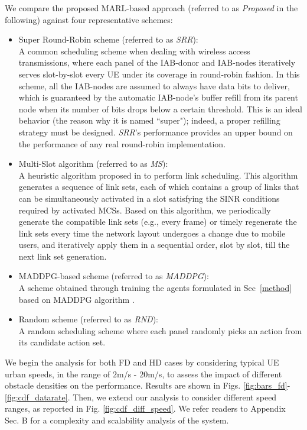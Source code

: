We compare the proposed MARL-based approach (referred to as \textit{Proposed} in the following) against four representative schemes:
\begin{itemize}
	\item Super Round-Robin scheme (referred to as \textit{SRR}):\\
    A common scheduling scheme when dealing with wireless access transmissions, where each panel of the IAB-donor and IAB-nodes iteratively serves slot-by-slot every UE under its coverage in round-robin fashion. In this scheme, all the IAB-nodes are assumed to always have data bits to deliver, which is guaranteed by the automatic IAB-node's buffer refill from its parent node when its number of bits drops below a certain threshold. This is an ideal behavior (the reason why it is named ``super"); indeed, a proper refilling strategy must be designed. \textit{SRR}'s performance provides an upper bound on the performance of any real round-robin implementation.
	\item Multi-Slot algorithm (referred to as \textit{MS}):\\
 A heuristic algorithm proposed in \cite{saad2019millimeter} to perform link scheduling. This algorithm generates a sequence of link sets, each of which contains a group of links that can be simultaneously activated in a slot satisfying the SINR conditions required by activated MCSs. Based on this algorithm, we periodically generate the compatible link sets (e.g., every frame) or timely regenerate the link sets every time the network layout undergoes a change due to mobile users, and iteratively apply them in a sequential order, slot by slot, till the next link set generation.
        
        \item MADDPG-based scheme (referred to as \textit{MADDPG}):\\ A scheme obtained through training the agents formulated in Sec~\ref{method} based on MADDPG algorithm \cite{maddpg}. 
        
        \item Random scheme (referred to as \textit{RND}):\\
        A random scheduling scheme where each panel randomly picks an action from its candidate action set.
\end{itemize}

We begin the analysis for both FD and HD cases by considering typical UE urban speeds, in the range of $2$m/s - $20$m/s, to assess the impact of different obstacle densities on the performance. Results are shown in Figs. \ref{fig:bars_fd}-\ref{fig:cdf_datarate}. Then, we extend our analysis to consider different speed ranges, as reported in Fig. \ref{fig:cdf_diff_speed}. We refer readers to Appendix Sec. B for a complexity and scalability analysis of the system.

